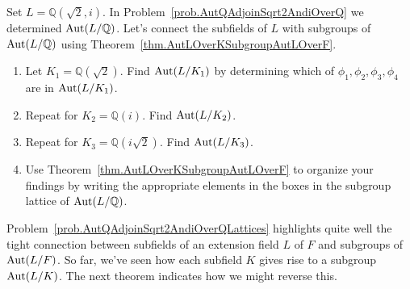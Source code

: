 \begin{problem}\label{prob.AutQAdjoinSqrt2AndiOverQLattices}
Set $L = \mathbb{Q}(\sqrt{2},i)$. In Problem~\ref{prob.AutQAdjoinSqrt2AndiOverQ} we determined $\operatorname{Aut}(L/\mathbb{Q})$. Let's connect the subfields of $L$ with subgroups of $\operatorname{Aut}(L/\mathbb{Q})$ using Theorem~\ref{thm.AutLOverKSubgroupAutLOverF}. 
\begin{enumerate}
\item Let $K_1 = \mathbb{Q}(\sqrt{2})$. Find $\operatorname{Aut}(L/K_1)$ by determining which of  $\phi_1, \phi_2,\phi_3,\phi_4$ are in $\operatorname{Aut}(L/K_1)$.
\item Repeat for $K_2 = \mathbb{Q}(i)$. Find $\operatorname{Aut}(L/K_2)$.
\item Repeat for $K_3 = \mathbb{Q}(i\sqrt{2})$. Find $\operatorname{Aut}(L/K_3)$.
\item Use Theorem~\ref{thm.AutLOverKSubgroupAutLOverF} to organize your findings by writing the appropriate elements in the boxes in the subgroup lattice of $\operatorname{Aut}(L/\mathbb{Q})$.
\begin{center}
\end{center}
\end{enumerate}
\end{problem}

Problem~\ref{prob.AutQAdjoinSqrt2AndiOverQLattices} highlights quite well the tight connection between subfields of an extension field $L$ of $F$ and subgroups of $\operatorname{Aut}(L/F)$. So far, we've seen how each subfield $K$ gives rise to a subgroup $\operatorname{Aut}(L/K)$. The next theorem indicates how we might reverse this.

